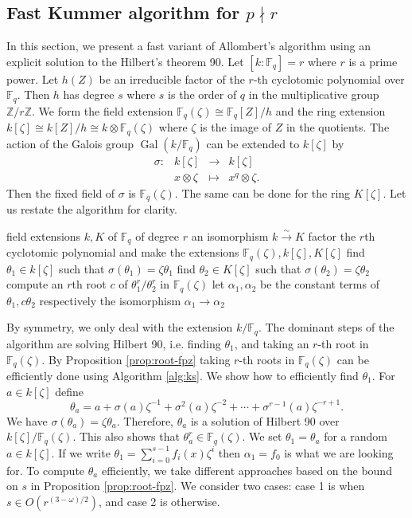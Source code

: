 \documentclass[12pt]{article}
\theoremstyle{plain}
\theoremstyle{definition}
\DeclareMathOperator{\gal}{Gal} %
\def\Z{\ensuremath{\mathbb{Z}}}
\def\F{\ensuremath{\mathbb{F}}}
\newcounter{algorithm}
\begin{document}
\subsection{Fast Kummer algorithm for $p \nmid r$}
\label{sec:fast-kummer}

In this section, we present a fast variant of Allombert's algorithm using an explicit solution to 
the Hilbert's theorem 90. Let $[k: \F_q] = r$ where $r$ is a prime power. Let $h(Z)$ be an 
irreducible factor of the $r$-th cyclotomic polynomial over $\F_q$. Then $h$ has degree $s$ where 
$s$ is the order of $q$ in the multiplicative group $\Z/r\Z$. We form the field extension 
$\F_q(\zeta) \cong \F_q[Z] / h$ and the ring extension $k[\zeta] \cong k[Z] / h \cong k \otimes 
\F_q(\zeta)$ where $\zeta$ is the image of $Z$ in the quotients. The action of the Galois group 
$\gal(k / \F_q)$ can be extended to $k[\zeta]$ by
\[
\begin{array}{llll}
\sigma: & k[\zeta] & \rightarrow & k[\zeta] \\
& x \otimes \zeta & \mapsto & x^q \otimes \zeta.
\end{array}
\]
Then the fixed field of $\sigma$ is $\F_q(\zeta)$. The same can be done for the ring $K[\zeta]$. 
Let us restate the algorithm for clarity.

\begin{algorithm}[Allombert]
	\begin{algorithmic}[1]
		\REQUIRE field extensions $k, K$ of $\F_q$ of degree $r$
		\ENSURE an isomorphism $k \xrightarrow{\sim} K$
		\STATE factor the $r$th cyclotomic polynomial and make the extensions $\F_q(\zeta), 
		k[\zeta], K[\zeta]$
		\STATE find $\theta_1 \in k[\zeta]$ such that $\sigma(\theta_1) = \zeta\theta_1$
		\STATE find $\theta_2 \in K[\zeta]$ such that $\sigma(\theta_2) = \zeta\theta_2$
		\STATE compute an $r$th root $c$ of $\theta_1^r / \theta_2^r$ in $\F_q(\zeta)$
		\STATE let $\alpha_1, \alpha_2$ be the constant terms of $\theta_1, c\theta_2$ respectively
		\RETURN the isomorphism $\alpha_1 \rightarrow \alpha_2$
	\end{algorithmic}
\end{algorithm}

By symmetry, we only deal with the extension $k / \F_q$. The dominant steps of the algorithm are 
solving Hilbert 90, i.e. finding $\theta_1$, and taking an $r$-th root in $\F_q(\zeta)$. By 
Proposition \ref{prop:root-fpz} taking $r$-th roots in $\F_q(\zeta)$ can be efficiently done using 
Algorithm \ref{alg:ks}. We show how to efficiently find $\theta_1$. For $a \in k[\zeta]$ define
\[ \theta_a = a + \sigma(a)\zeta^{-1} + \sigma^2(a)\zeta^{-2} + \cdots + \sigma^{r - 1}(a)\zeta^{-r 
	+ 1}. \]
We have $\sigma(\theta_a) = \zeta\theta_a$. Therefore, $\theta_a$ is a solution of Hilbert 90 over 
$k[\zeta]/\F_q(\zeta)$. This also shows that $\theta_a^r \in \F_q(\zeta)$. We set $\theta_1 = 
\theta_a$ for a random $a \in k[\zeta]$. If we write $\theta_1 = \sum_{i = 0}^{s - 1}f_i(x)\zeta^i$ 
then $\alpha_1 = f_0$ is what we are looking for. To compute $\theta_a$ efficiently, we take 
different approaches based on the bound on $s$ in Proposition \ref{prop:root-fpz}. We consider two 
cases: case 1 is when $s \in O(r^{(3 - \omega) / 2})$, and case 2 is otherwise. 
\end{document}
